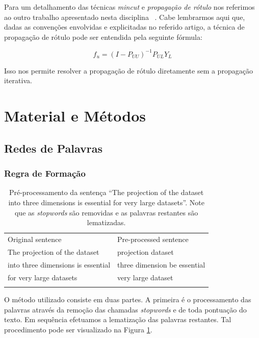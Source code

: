\documentclass[12pt]{article}
\begin{document}
Para um detalhamento das técnicas \emph{mincut} e \emph{propagação de rótulo} nos referimos ao outro trabalho apresentado nesta disciplina ~\cite{sslgraph}. Cabe lembrarmos aqui que, dadas as convenções envolvidas e explicitadas no referido artigo, a técnica de propagação de rótulo pode ser entendida pela seguinte fórmula:

\begin{equation}
  f_u = (I - P_{UU})^{-1}P_{UL}Y_{L}
\end{equation}

Isso nos permite resolver a propagação de rótulo diretamente sem a propagação iterativa.


\section{Material e Métodos}
\subsection{Redes de Palavras}
\subsubsection{Regra de Formação}

\begin{table}
\centering
\caption{Pré-processamento da sentença ``The projection of the dataset into three dimensions is essential for very large datasets''. Note que as \emph{stopwords} são removidas e as palavras restantes são lematizadas.}
\label{tab:a0}       %
\begin{tabular}{p{3.5cm}p{3.5cm}}
\hline\noalign{\smallskip}
Original sentence & Pre-processed sentence    \\
\noalign{\smallskip}\svhline\noalign{\smallskip}
{\small The projection of the dataset} 			& {\small projection dataset}\\
{\small into three dimensions is essential} 		& {\small three dimension be essential}\\
{\small for very large datasets}						& {\small very large dataset}\\
\noalign{\smallskip}\hline\noalign{\smallskip}
\end{tabular}
\end{table}

O método utilizado consiste em duas partes. A primeira é o processamento das palavras através da remoção das chamadas \emph{stopwords} e de toda pontuação do texto. Em sequência efetuamos a lematização das palavras restantes. Tal procedimento pode ser visualizado na Figura \ref{tab:a0}.
\end{document}
